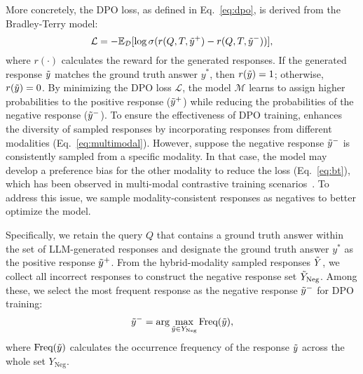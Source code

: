 More concretely, the DPO loss, as defined in Eq.~\ref{eq:dpo}, is derived from the Bradley-Terry model:
\begin{equation}\label{eq:bt}
 \mathcal{L} = -\mathbb{E}_\mathcal{D} [\log \sigma (r(Q, T, \Tilde{y}^+)-r(Q, T, \Tilde{y}^-))],
\end{equation}
where $r(\cdot)$ calculates the reward for the generated responses. If the generated response $\Tilde{y}$ matches the ground truth answer $y^*$, then $r(\Tilde{y})=1$; otherwise, $r(\Tilde{y})=0$. By minimizing the DPO loss $\mathcal{L}$, the model $\mathcal{M}$ learns to assign higher probabilities to the positive response ($\Tilde{y}^+$) while reducing the probabilities of the negative response ($\Tilde{y}^-$).
To ensure the effectiveness of DPO training, \method{} enhances the diversity of sampled responses by incorporating responses from different modalities (Eq.~\ref{eq:multimodal}). However, suppose the negative response $\Tilde{y}^-$ is consistently sampled from a specific modality. In that case, the model may develop a preference bias for the other modality to reduce the loss (Eq.~\ref{eq:bt}), which has been observed in multi-modal contrastive training scenarios~\cite{liu2023universal}. To address this issue, we sample modality-consistent responses as negatives to better optimize the model.

Specifically, we retain the query $Q$ that contains a ground truth answer within the set of LLM-generated responses and designate the ground truth answer $y^*$ as the positive response $\Tilde{y}^+$. From the hybrid-modality sampled responses $\Tilde{Y}$, we collect all incorrect responses to construct the negative response set $\Tilde{Y}_\text{Neg}$. Among these, we select the most frequent response as the negative response $\Tilde{y}^-$ for DPO training:
\begin{equation}
 \Tilde{y}^- = \arg\max_{\Tilde{y} \in Y_\text{Neg}} \text{Freq} (\Tilde{y}),
\end{equation}
where $\text{Freq} (\Tilde{y})$ calculates the occurrence frequency of the response $\Tilde{y}$ across the whole set $Y_\text{Neg}$.
